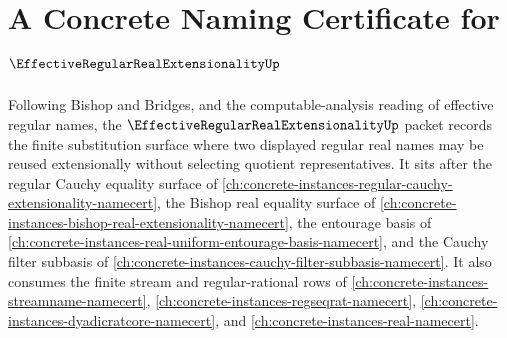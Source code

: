 \chapter{A Concrete Naming Certificate for $\EffectiveRegularRealExtensionalityUp$}
\label{ch:concrete-instances-effective-regular-real-extensionality-namecert}

Following Bishop and Bridges, and the computable-analysis reading of effective regular names, the $\EffectiveRegularRealExtensionalityUp$ packet records the finite substitution surface where two displayed regular real names may be reused extensionally without selecting quotient representatives. It sits after the regular Cauchy equality surface of \autoref{ch:concrete-instances-regular-cauchy-extensionality-namecert}, the Bishop real equality surface of \autoref{ch:concrete-instances-bishop-real-extensionality-namecert}, the entourage basis of \autoref{ch:concrete-instances-real-uniform-entourage-basis-namecert}, and the Cauchy filter subbasis of \autoref{ch:concrete-instances-cauchy-filter-subbasis-namecert}. It also consumes the finite stream and regular-rational rows of \autoref{ch:concrete-instances-streamname-namecert}, \autoref{ch:concrete-instances-regseqrat-namecert}, \autoref{ch:concrete-instances-dyadicratcore-namecert}, and \autoref{ch:concrete-instances-real-namecert}.

